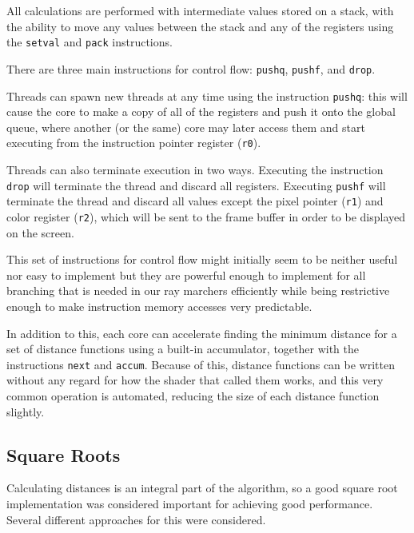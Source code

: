			All calculations are performed with intermediate values stored on a
			stack, with the ability to move any values between the stack and
			any of the registers using the \texttt{setval} and \texttt{pack}
			instructions.

			There are three main instructions for control flow: \texttt{pushq},
			\texttt{pushf}, and \texttt{drop}. 

			Threads can spawn new threads at any time using the instruction
			\texttt{pushq}: this will cause the core to make a copy of all of
			the registers and push it onto the global queue, where another (or
			the same) core may later access them and start executing from the
			instruction pointer register (\texttt{r0}).

			Threads can also terminate execution in two ways. Executing the
			instruction \texttt{drop} will terminate the thread and discard all
			registers. Executing \texttt{pushf} will terminate the thread and
			discard all values except the pixel pointer (\texttt{r1}) and color
			register (\texttt{r2}), which will be sent to the frame buffer in
			order to be displayed on the screen.

			This set of instructions for control flow might initially seem to
			be neither useful nor easy to implement but they are powerful
			enough to implement for all branching that is needed in our ray
			marchers efficiently while being restrictive enough to make
			instruction memory accesses very predictable.

			In addition to this, each core can accelerate finding the minimum 
			distance for a set of distance functions using a built-in 
			accumulator, together with the instructions \texttt{next} and 
			\texttt{accum}. Because of this, distance functions can be written
			without any regard for how the shader that called them works, and
			this very common operation is automated, reducing the size of each
			distance function slightly.

		\subsection{Square Roots}

			Calculating distances is an integral part of the algorithm, so a
			good square root implementation was considered important for
			achieving good performance. Several different approaches for this
			were considered.

